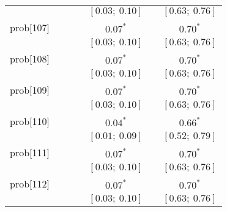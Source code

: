 \begin{table}
\begin{center}
\begin{tabular}{l c c c c c c }
          &                           &                           &                           & $[0.03;\ 0.10]$         &                           & $[0.63;\ 0.76]$       \\
prob[107] &                           &                           &                           & $0.07^{*}$              &                           & $0.70^{*}$            \\
          &                           &                           &                           & $[0.03;\ 0.10]$         &                           & $[0.63;\ 0.76]$       \\
prob[108] &                           &                           &                           & $0.07^{*}$              &                           & $0.70^{*}$            \\
          &                           &                           &                           & $[0.03;\ 0.10]$         &                           & $[0.63;\ 0.76]$       \\
prob[109] &                           &                           &                           & $0.07^{*}$              &                           & $0.70^{*}$            \\
          &                           &                           &                           & $[0.03;\ 0.10]$         &                           & $[0.63;\ 0.76]$       \\
prob[110] &                           &                           &                           & $0.04^{*}$              &                           & $0.66^{*}$            \\
          &                           &                           &                           & $[0.01;\ 0.09]$         &                           & $[0.52;\ 0.79]$       \\
prob[111] &                           &                           &                           & $0.07^{*}$              &                           & $0.70^{*}$            \\
          &                           &                           &                           & $[0.03;\ 0.10]$         &                           & $[0.63;\ 0.76]$       \\
prob[112] &                           &                           &                           & $0.07^{*}$              &                           & $0.70^{*}$            \\
          &                           &                           &                           & $[0.03;\ 0.10]$         &                           & $[0.63;\ 0.76]$       \\

\end{tabular}
\end{center}
\end{table}
